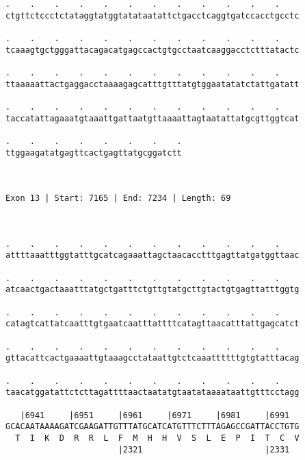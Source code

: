 \documentclass{article}
\begin{document}
\begin{Verbatim}
.    .    .    .    .    .    .    .    .    .    .    .    
ctgttctccctctataggtatggtatataatattctgacctcaggtgatccacctgcctc
                                                            
.    .    .    .    .    .    .    .    .    .    .    .    
tcaaagtgctgggattacagacatgagccactgtgcctaatcaaggacctctttatactc
                                                            
.    .    .    .    .    .    .    .    .    .    .    .    
ttaaaaattactgaggacctaaaagagcatttgtttatgtggaatatatctattgatatt
                                                            
.    .    .    .    .    .    .    .    .    .    .    .    
taccatattagaaatgtaaattgattaatgttaaaattagtaatattatgcgttggtcat
                                                            
.    .    .    .    .    .    .    .
ttggaagatatgagttcactgagttatgcggatctt
                                    
                                    
 
Exon 13 | Start: 7165 | End: 7234 | Length: 69



.    .    .    .    .    .    .    .    .    .    .    .    
attttaaatttggtatttgcatcagaaattagctaacacctttgagttatgatggttaac
                                                            
.    .    .    .    .    .    .    .    .    .    .    .    
atcaactgactaaatttatgctgatttctgttgtatgcttgtactgtgagttatttggtg
                                                            
.    .    .    .    .    .    .    .    .    .    .    .    
catagtcattatcaatttgtgaatcaatttattttcatagttaacatttattgagcatct
                                                            
.    .    .    .    .    .    .    .    .    .    .    .    
gttacattcactgaaaattgtaaagcctataattgtctcaaattttttgtgtatttacag
                                                            
.    .    .    .    .    .    .    .    .    .    .    .    
taacatggatattctcttagattttaactaatatgtaatataaaataattgtttcctagg
                                                            
   |6941     |6951     |6961     |6971     |6981     |6991  
GCACAATAAAAGATCGAAGATTGTTTATGCATCATGTTTCTTTAGAGCCGATTACCTGTG
  T  I  K  D  R  R  L  F  M  H  H  V  S  L  E  P  I  T  C  V
                       |2321                         |2331  
  

\end{Verbatim}
\end{document}
